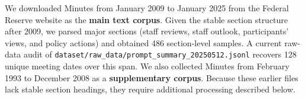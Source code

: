 %
We downloaded Minutes from January 2009 to January 2025 from the Federal Reserve website as the \textbf{main text corpus}. Given the stable section structure after 2009, we parsed major sections (staff reviews, staff outlook, participants' views, and policy actions) and obtained 486 section-level samples. A current raw-data audit of \texttt{dataset/raw\_data/prompt\_summary\_20250512.jsonl} recovers 128 unique meeting dates over this span. We also collected Minutes from February 1993 to December 2008 as a \textbf{supplementary corpus}. Because these earlier files lack stable section headings, they require additional processing described below.

